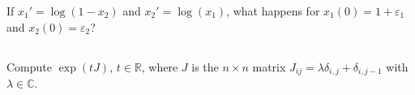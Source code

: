 \documentclass[12pt,a4paper]{article}
\newcommand{\IC}{\mathbb{C}}
\begin{document}
    If $x_1' = \log(1 - x_2)$ and $x_2' = \log(x_1)$,
    what happens
    for $x_1(0) = 1 + \varepsilon_1$ and $x_2(0) = \varepsilon_2$?

    \setcounter{section}{1}
    \setcounter{subsection}{19}
    
    \subsection{}
    
    Compute $\exp(t J)$, $t \in \mathbb{R}$,
    where $J$ is the $n \times n$ matrix
    $J_{i j} = \lambda \delta_{i, j} + \delta_{i, j - 1}$
    with
    $\lambda \in \IC$.
\end{document}
